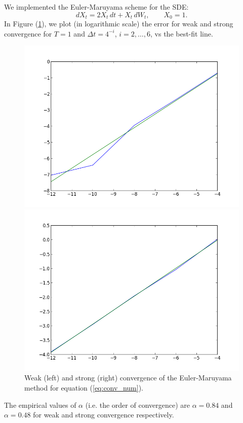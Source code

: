 \documentclass[a4paper,11pt]{article}
\theoremstyle{definition}
\theoremstyle{plain}
\theoremstyle{remark}
\begin{document}
We implemented the Euler-Maruyama scheme for the SDE:
\begin{equation}\label{eq:conv_num}
dX_t = 2X_t\,dt + X_t\,dW_t, \qquad X_0 = 1.
\end{equation}
In Figure (\ref{figure:ex10_em}), we plot (in logarithmic scale) the error for weak and strong convergence for $T=1$ and $\Delta t = 4^{-i}$, $i=2,\dots,6$, vs the best-fit line.
\begin{figure}[htbp]
\centering
\begin{minipage}[c]{.47\textwidth}
\includegraphics[width=\textwidth,
keepaspectratio]{ex10_em_w.png}
\end{minipage}
\hspace{4mm}
\begin{minipage}[c]{.47\textwidth}
\includegraphics[width=\textwidth,
keepaspectratio]{ex10_em_s.png}
\end{minipage}
\caption{ \label{figure:ex10_em} Weak (left) and strong (right) convergence of the Euler-Maruyama method for equation (\ref{eq:conv_num}).}
\end{figure}
The empirical values of $\alpha$ (i.e. the order of convergence) are $\alpha = 0.84$ and $\alpha = 0.48$ for weak and strong convergence respectively.
\end{document}
